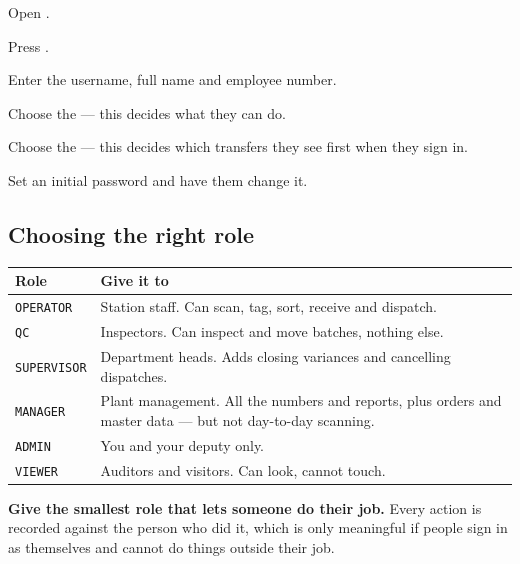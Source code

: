 Open .


\begin{steps}
  \item Press .
  \item Enter the username, full name and employee number.
  \item Choose the  --- this decides what they can do.
  \item Choose the  --- this decides which transfers they see
        first when they sign in.
  \item Set an initial password and have them change it.
\end{steps}

\subsection{Choosing the right role}


\begin{table}[H]
\centering
\small
\begin{tabular}{@{}p{30mm}p{108mm}@{}}
\toprule
\textbf{Role} & \textbf{Give it to} \\
\midrule
\texttt{OPERATOR}   & Station staff. Can scan, tag, sort, receive and dispatch. \\
\texttt{QC}         & Inspectors. Can inspect and move batches, nothing else. \\
\texttt{SUPERVISOR} & Department heads. Adds closing variances and cancelling dispatches. \\
\texttt{MANAGER}    & Plant management. All the numbers and reports, plus orders and master data --- but not day-to-day scanning. \\
\texttt{ADMIN}      & You and your deputy only. \\
\texttt{VIEWER}     & Auditors and visitors. Can look, cannot touch. \\
\bottomrule
\end{tabular}
\end{table}

\begin{stopbox}
\textbf{Give the smallest role that lets someone do their job.} Every action is
recorded against the person who did it, which is only meaningful if people sign
in as themselves and cannot do things outside their job.
\end{stopbox}

